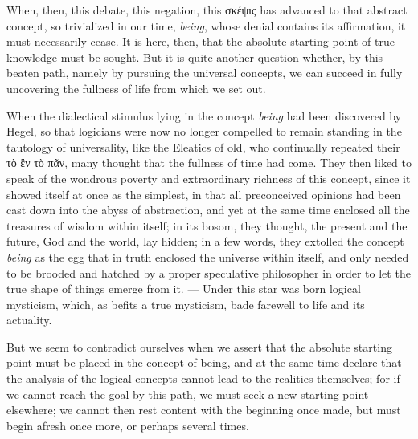 \documentclass[12pt]{book}
\newcommand{\opage}[1]{\marginnote{\footnotesize\textit{[#1]}}}
\begin{document}
When, then, this debate, this negation, this σκέψις has advanced to that
abstract concept, so trivialized in our time, \emph{being}, whose denial
contains its affirmation, it must necessarily cease. It is here, then, that the
absolute starting point of true knowledge must be sought. But it is quite
another question whether, by this beaten path, namely by pursuing the universal
concepts, we can succeed in fully uncovering the fullness of life from which we
set out.

When the dialectical stimulus lying in the concept \emph{being} had been
discovered by Hegel, so that logicians were now no longer compelled to remain
standing in the tautology of universality, like the Eleatics of old, who
continually repeated their τὸ ἓν τὸ πᾶν, many thought that the fullness of time
had come. They then liked to speak of the wondrous poverty and extraordinary
richness of this concept, since it showed itself at once as the simplest, in
that all preconceived opinions had been cast down
\opage{8} into the abyss of abstraction, and yet at the same time enclosed all
the treasures of wisdom within itself; in its bosom, they thought, the present
and the future, God and the world, lay hidden; in a few words, they extolled the
concept \emph{being} as the egg that in truth enclosed the universe within
itself, and only needed to be brooded and hatched by a proper speculative
philosopher in order to let the true shape of things emerge from it. --- Under
this star was born logical mysticism, which, as befits a true mysticism, bade
farewell to life and its actuality.

But we seem to contradict ourselves when we assert that the absolute starting
point must be placed in the concept of being, and at the same time declare that
the analysis of the logical concepts cannot lead to the realities themselves;
for if we cannot reach the goal by this path, we must seek a new starting point
elsewhere; we cannot then rest content with the beginning once made, but must
begin afresh once more, or perhaps several times.
\end{document}
